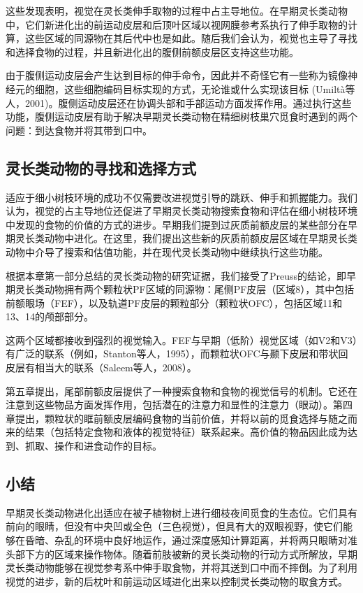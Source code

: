 这些发现表明，视觉在灵长类伸手取物的过程中占主导地位。在早期灵长类动物中，它们新进化出的前运动皮层和后顶叶区域以视网膜参考系执行了伸手取物的计算，这些区域的同源物在其后代中也是如此。随后我们会认为，视觉也主导了寻找和选择食物的过程，并且新进化出的腹侧前额皮层区支持这些功能。

由于腹侧运动皮层会产生达到目标的伸手命令，因此并不奇怪它有一些称为镜像神经元的细胞，这些细胞编码目标实现的方式，无论谁或什么实现该目标 (Umiltà等人，2001)。腹侧运动皮层还在协调头部和手部运动方面发挥作用。通过执行这些功能，腹侧运动皮层有助于解决早期灵长类动物在精细树枝巢穴觅食时遇到的两个问题：到达食物并将其带到口中。

\subsection{灵长类动物的寻找和选择方式}
适应于细小树枝环境的成功不仅需要改进视觉引导的跳跃、伸手和抓握能力。我们认为，视觉的占主导地位还促进了早期灵长类动物搜索食物和评估在细小树枝环境中发现的食物的价值的方式的进步。早期我们提到过灰质前额皮层的某些部分在早期灵长类动物中进化。在这里，我们提出这些新的灰质前额皮层区域在早期灵长类动物中介导了搜索和估值功能，并在现代灵长类动物中继续执行这些功能。

根据本章第一部分总结的灵长类动物的研究证据，我们接受了Preuss的结论，即早期灵长类动物拥有两个颗粒状PF区域的同源物：尾侧PF皮层（区域8），其中包括前额眼场（FEF），以及轨道PF皮层的颗粒部分（颗粒状OFC），包括区域11和13、14的颅部部分。

这两个区域都接收到强烈的视觉输入。FEF与早期（低阶）视觉区域（如V2和V3）有广泛的联系（例如，Stanton等人，1995），而颗粒状OFC与颞下皮层和带状回皮层有相当大的联系（Saleem等人，2008）。

第五章提出，尾部前额皮层提供了一种搜索食物和食物的视觉信号的机制。它还在注意到这些物品方面发挥作用，包括潜在的注意力和显性的注意力（眼动）。第四章提出，颗粒状的眶前额皮层编码食物的当前价值，并将以前的觅食选择与随之而来的结果（包括特定食物和液体的视觉特征）联系起来。高价值的物品因此成为达到、抓取、操作和进食动作的目标。

\subsection{小结}
早期灵长类动物进化出适应在被子植物树上进行细枝夜间觅食的生态位。它们具有前向的眼睛，但没有中央凹或全色（三色视觉），但具有大的双眼视野，使它们能够在昏暗、杂乱的环境中良好地运作，通过深度感知计算距离，并将两只眼睛对准头部下方的区域来操作物体。随着前肢被新的灵长类动物的行动方式所解放，早期灵长类动物能够在视觉参考系中伸手取食物，并将其送到口中而不摔倒。为了利用视觉的进步，新的后枕叶和前运动区域进化出来以控制灵长类动物的取食方式。

